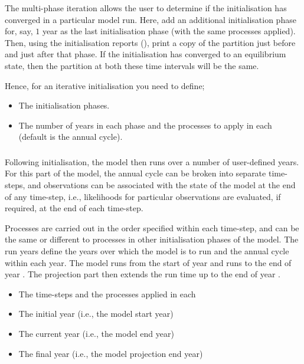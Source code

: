 The multi-phase iteration allows the user to determine if the initialisation has converged in a particular model run. Here, add an additional initialisation phase for, say, $1$ year as the last initialisation phase (with the same processes applied). Then, using the initialisation reports (), print a copy of the partition just before and just after that phase. If the initialisation has converged to an equilibrium state, then the partition at both these time intervals will be the same.

Hence, for an iterative initialisation you need to define;
\begin{itemize}
  \item The initialisation phases.
  \item The number of years in each phase and the processes to apply in each (default is the annual cycle).
\end{itemize}

\subsubsection{}

Following initialisation, the model then runs over a number of user-defined years. For this part of the model, the annual cycle can be broken into separate time-steps, and observations can be associated with the state of the model at the end of any time-step, i.e., likelihoods for particular observations are evaluated, if required, at the end of each time-step. 

Processes are carried out in the order specified within each time-step, and can be the same or different to processes in other initialisation phases of the model. The run years define the years over which the model is to run and the annual cycle within each year. The model runs from the start of year  and runs to the end of year . The projection part then extends the run time up to the end of year . 

\begin{itemize}
  \item The time-steps and the processes applied in each
  \item The initial year (i.e., the model start year)
  \item The current year (i.e., the model end year)
  \item The final year (i.e., the model projection end year)
\end{itemize}

